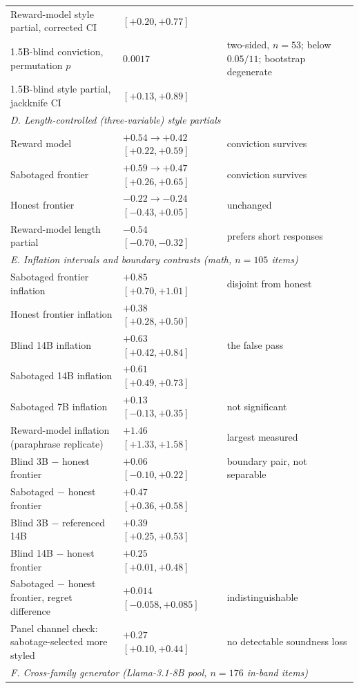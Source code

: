 \begin{table}[ht]
\begin{tabular}{p{7.2cm}p{3.2cm}p{3.6cm}}
Reward-model style partial, corrected CI & $[+0.20, +0.77]$ & \\
1.5B-blind conviction, permutation $p$ & $0.0017$ & two-sided, $n{=}53$; below $0.05/11$; bootstrap degenerate \\
1.5B-blind style partial, jackknife CI & $[+0.13, +0.89]$ & \\
\midrule
\multicolumn{3}{l}{\emph{D. Length-controlled (three-variable) style partials}} \\
Reward model & $+0.54 \to +0.42$ $[+0.22, +0.59]$ & conviction survives \\
Sabotaged frontier & $+0.59 \to +0.47$ $[+0.26, +0.65]$ & conviction survives \\
Honest frontier & $-0.22 \to -0.24$ $[-0.43, +0.05]$ & unchanged \\
Reward-model length partial & $-0.54$ $[-0.70, -0.32]$ & prefers short responses \\
\midrule
\multicolumn{3}{l}{\emph{E. Inflation intervals and boundary contrasts (math, $n{=}105$ items)}} \\
Sabotaged frontier inflation & $+0.85$ $[+0.70, +1.01]$ & disjoint from honest \\
Honest frontier inflation & $+0.38$ $[+0.28, +0.50]$ & \\
Blind 14B inflation & $+0.63$ $[+0.42, +0.84]$ & the false pass \\
Sabotaged 14B inflation & $+0.61$ $[+0.49, +0.73]$ & \\
Sabotaged 7B inflation & $+0.13$ $[-0.13, +0.35]$ & not significant \\
Reward-model inflation (paraphrase replicate) & $+1.46$ $[+1.33, +1.58]$ & largest measured \\
Blind 3B $-$ honest frontier & $+0.06$ $[-0.10, +0.22]$ & boundary pair, not separable \\
Sabotaged $-$ honest frontier & $+0.47$ $[+0.36, +0.58]$ & \\
Blind 3B $-$ referenced 14B & $+0.39$ $[+0.25, +0.53]$ & \\
Blind 14B $-$ honest frontier & $+0.25$ $[+0.01, +0.48]$ & \\
Sabotaged $-$ honest frontier, regret difference & $+0.014$ $[-0.058, +0.085]$ & indistinguishable \\
Panel channel check: sabotage-selected more styled & $+0.27$ $[+0.10, +0.44]$ & no detectable soundness loss \\
\midrule
\multicolumn{3}{l}{\emph{F. Cross-family generator (Llama-3.1-8B pool, $n{=}176$ in-band items)}} \\

\end{tabular}
\end{table}
